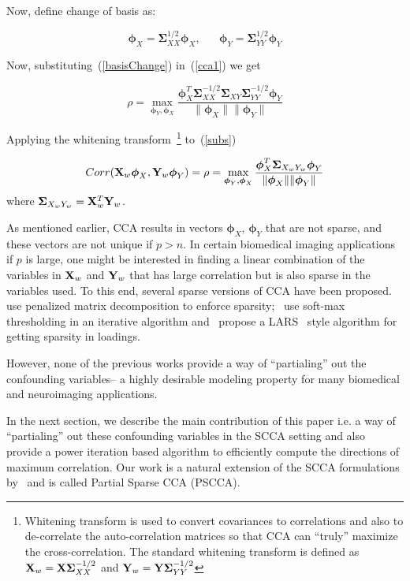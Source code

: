 \documentclass{llncs}
\newcommand{\X}{{\bf X}}
\newcommand{\Y}{{\bf Y}}
\newcommand{\bs}{\boldsymbol}
\begin{document}
Now, define change of basis as:

\begin{equation}
\label{basisChange}
\bs\phi_X = \bs\Sigma_{XX}^{1/2}\bs\phi_X, \;\;\;\;\;\;   \bs\phi_Y = \bs\Sigma_{YY}^{1/2}\bs\phi_Y 
\end{equation}

Now, substituting~(\ref{basisChange}) in~(\ref{cca1}) we get 

\begin{equation}
\label{subs}
\rho= \max_{{\bs\phi_Y}, {\bs\phi_X}} \frac{\bs\phi_X^T \bs\Sigma_{XX}^{-1/2}\bs\Sigma_{XY}\bs\Sigma_{YY}^{-1/2}\bs\phi_Y}{\|\bs\phi_X\| \|\bs\phi_Y\|}
\end{equation}

Applying the whitening transform~\footnote{Whitening transform is used to convert covariances to correlations and also to de-correlate the auto-correlation matrices so that CCA can ``truly'' maximize the cross-correlation. The standard whitening transform is defined as $\X_w= \X\bs\Sigma_{XX}^{-1/2}$ and $\Y_w= \Y\bs\Sigma_{YY}^{-1/2}$} to~(\ref{subs})

\begin{equation}
\label{simplifiedcca}
Corr(\X_w\bs\phi_X,\Y_w\bs\phi_Y)=\rho=\max_{{\bs\phi_Y}, {\bs\phi_X}} \frac{\bs\phi_X^T \bs\Sigma_{X_wY_w}\bs\phi_Y}{\|\bs\phi_X\| \|\bs\phi_Y\|}
\end{equation}
where $\bs\Sigma_{X_wY_w} = \X_w^T\Y_w$. 

As mentioned earlier, CCA results in vectors $\bs\phi_X$, $\bs\phi_Y$ that are not sparse, and these vectors are not unique if $p > n$. In certain biomedical imaging applications if $p$ is large, one might be interested in finding a linear combination of the variables in $\X_w$ and $\Y_w$ that has large correlation but is also sparse in the variables used. To this end, several sparse versions of CCA have been proposed. ~\cite{parkhomenko} use penalized matrix decomposition to enforce sparsity;~\cite{parkhomenko} use soft-max thresholding in an iterative algorithm and~\cite{lykou} propose a LARS~\cite{lars} style algorithm for getting sparsity in loadings.

However, none of the previous works provide a way of ``partialing'' out the confounding variables-- a highly desirable modeling property for many biomedical and neuroimaging applications. 

In the next section, we describe the main contribution of this paper i.e. a way of ``partialing'' out these confounding variables in the SCCA setting and also provide a power iteration based algorithm to efficiently compute the directions of maximum correlation. Our work is a natural extension of the SCCA formulations by~\cite{parkhomenko,witten} and is called Partial Sparse CCA (PSCCA).
\end{document}
